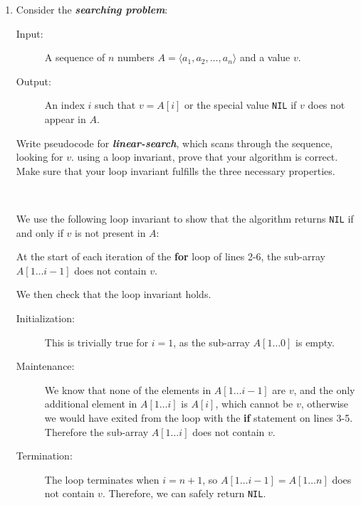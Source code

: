\documentclass[Chapter02]{subfiles}
\begin{document}
\begin{enumerate}
		\item \label{exer:ch02-linear-search} Consider the \textbf{\textit{searching problem}}:
		\begin{description}
			\item[Input:] A sequence of $n$ numbers $A = \langle a_1, a_2, \dots, a_n \rangle$ and a value $v$.
			\item[Output:] An index $i$ such that $v = A[i]$ or the special value \texttt{NIL} if $v$ does not appear in $A$.
		\end{description}
		Write pseudocode for \textbf{\textit{linear-search}}, which scans through the sequence, looking for $v$. using a loop invariant, prove that your algorithm is correct. Make sure that your loop invariant fulfills the three necessary properties.
		\begin{answer}
			\hfill\\
			\begin{algorithm}[H]

			\end{algorithm}
			We use the following loop invariant to show that the algorithm returns \texttt{NIL} if and only if $v$ is not present in $A$:

			\begin{addmargin}[2em]{2em}
				At the start of each iteration of the \textbf{for} loop of lines 2-6, the sub-array $A[1 \dots i - 1]$ does not contain $v$.
			\end{addmargin}

			We then check that the loop invariant holds.

			\begin{description}
				\item[Initialization:] This is trivially true for $i = 1$, as the sub-array $A[1 \dots 0]$ is empty.

				\item[Maintenance:] We know that none of the elements in $A[1 \dots i - 1]$ are $v$, and the only additional element in $A[1 \dots i]$ is $A[i]$, which cannot be $v$, otherwise we would have exited from the loop with the \textbf{if} statement on lines 3-5. Therefore the sub-array $A[1 \dots i]$ does not contain $v$.

				\item[Termination:] The loop terminates when $i = n + 1$, so $A[1 \dots i - 1] = A[1 \dots n]$ does not contain $v$. Therefore, we can safely return \texttt{NIL}.
			\end{description}
			

\end{answer}
\end{enumerate}
\end{document}
